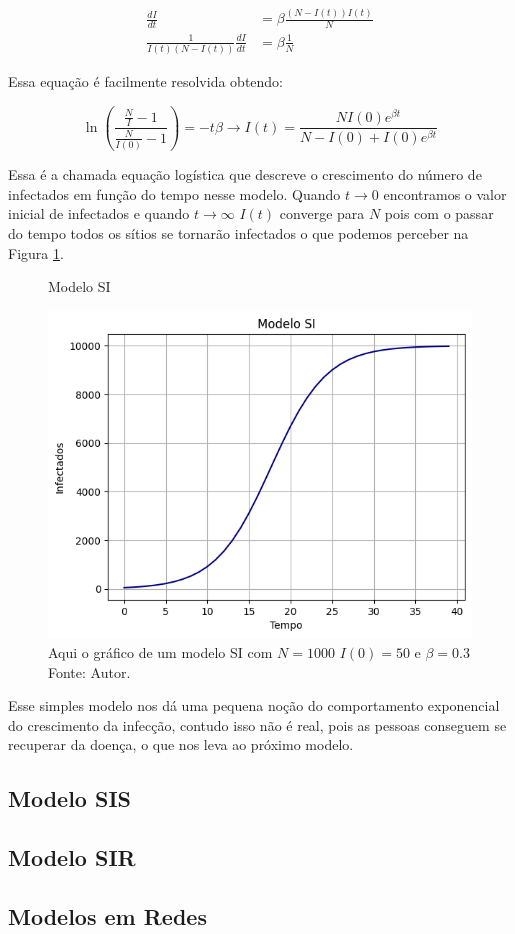 \begin{align}
  \frac{dI}{dt} &=\beta\frac{(N - I(t))I(t)}{N}\\
  \frac{1}{I(t)(N - I(t))}\frac{dI}{dt} &= \beta\frac{1}{N}
\end{align}

Essa equação é facilmente resolvida obtendo:

\begin{equation}
  \ln{(\frac{\frac{N}{I} -1 }{\frac{N}{I(0)} -1 })} = -t\beta \rightarrow I(t) = \frac{NI(0)e^{\beta t}}{N - I(0) + I(0)e^{\beta t}}
\end{equation}

Essa é a chamada equação logística que descreve o crescimento do número de infectados em função do tempo nesse modelo. Quando $t \rightarrow 0$ encontramos o valor inicial de infectados e quando $t \rightarrow \infty$ $I(t)$ converge para $N$ pois com o passar do tempo todos os sítios se tornarão infectados o que podemos perceber na Figura \ref{SI}.

\begin{figure}[H]
  \centering
  \captionsetup{font=normalsize,skip=1pt,singlelinecheck=on,labelsep=endash}
  \caption{Modelo SI}
  \includegraphics[scale=0.8]{./img/SI.png}
  \captionsetup{font=small,position=below,skip=-1pt}
   \caption*{Aqui o gráfico de um modelo SI com $N = 1000$ $I(0) = 50$ e $\beta = 0.3$\\Fonte: Autor.}
   \label{SI}
\end{figure}

Esse simples modelo nos dá uma pequena noção do comportamento exponencial do crescimento da infecção, contudo isso não é real, pois as pessoas conseguem se recuperar da doença, o que nos leva ao próximo modelo.

\subsection{Modelo SIS}



\subsection{Modelo SIR}

\subsection{Modelos em Redes}

